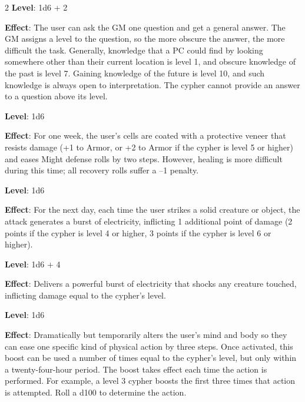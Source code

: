 \begin{multicols}{2}
\textbf{Level}: 1d6 + 2

\textbf{Effect}: The user can ask the GM one question and get a general answer. The GM assigns a level to the question, so the more obscure the answer, the more difficult the task. Generally, knowledge that a PC could find by looking somewhere other than their current location is level 1, and obscure knowledge of the past is level 7. Gaining knowledge of the future is level 10, and such knowledge is always open to interpretation. The cypher cannot provide an answer to a question above its level.


\textbf{Level}: 1d6

\textbf{Effect}: For one week, the user’s cells are coated with a protective veneer that resists damage (+1 to Armor, or +2 to Armor if the cypher is level 5 or higher) and eases Might defense rolls by two steps. However, healing is more difficult during this time; all recovery rolls suffer a –1 penalty.     


\textbf{Level}: 1d6

\textbf{Effect}: For the next day, each time the user strikes a solid creature or object, the attack generates a burst of electricity, inflicting 1 additional point of damage (2 points if the cypher is level 4 or higher, 3 points if the cypher is level 6 or higher).


\textbf{Level}: 1d6 + 4

\textbf{Effect}: Delivers a powerful burst of electricity that shocks any creature touched, inflicting damage equal to the cypher’s level.


\textbf{Level}: 1d6

\textbf{Effect}: Dramatically but temporarily alters the user’s mind and body so they can ease one specific kind of physical action by three steps. Once activated, this boost can be used a number of times equal to the cypher’s level, but only within a twenty-four-hour period. The boost takes effect each time the action is performed. For example, a level 3 cypher boosts the first three times that action is attempted. Roll a d100 to determine the action.

\end{multicols}

